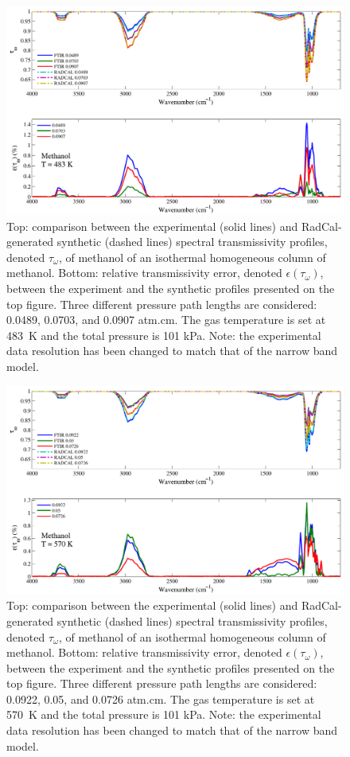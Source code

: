 \begin{figure}[p]
\includegraphics[width=\textwidth]{../Verification/Results_Test2/Methanol_483.pdf}
\caption{Top: comparison between the experimental (solid lines) and RadCal-generated synthetic (dashed lines) spectral transmissivity profiles, denoted $\tau_{\omega}$, of methanol of an isothermal homogeneous column of methanol. Bottom: relative transmissivity error, denoted $\epsilon{(\tau_{\omega})}$, between the experiment and the synthetic profiles presented on the top figure. Three different pressure path lengths are considered: 0.0489, 0.0703, and 0.0907 atm.cm. The gas temperature is set at 483~K and the total pressure is 101 kPa. Note: the experimental data resolution has been changed to match that of the narrow band model. \label{fig:methanol_Verify_483K}}
\end{figure}

\begin{figure}[p]
\includegraphics[width=\textwidth]{../Verification/Results_Test2/Methanol_570.pdf}
\caption{Top: comparison between the experimental (solid lines) and RadCal-generated synthetic (dashed lines) spectral transmissivity profiles, denoted $\tau_{\omega}$, of methanol of an isothermal homogeneous column of methanol. Bottom: relative transmissivity error, denoted $\epsilon{(\tau_{\omega})}$, between the experiment and the synthetic profiles presented on the top figure. Three different pressure path lengths are considered: 0.0922, 0.05, and 0.0726 atm.cm. The gas temperature is set at 570~K and the total pressure is 101 kPa. Note: the experimental data resolution has been changed to match that of the narrow band model. \label{fig:methanol_Verify_570K}}
\end{figure}

